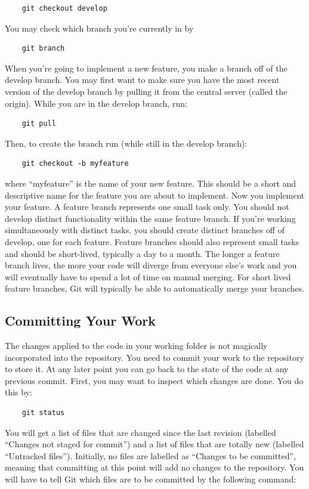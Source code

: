 \documentclass[10pt,a4paper]{article}
\begin{document}
\begin{verbatim}
	git checkout develop
\end{verbatim}
You may check which branch you're currently in by 

\begin{verbatim}
	git branch
\end{verbatim}

When you're going to implement a new feature, you make a branch off of the develop branch. You may first want to make sure you have the most recent version of the develop branch by pulling it from the central server (called the origin). While you are in the develop branch, run:

\begin{verbatim}
	git pull
\end{verbatim}
Then, to create the branch run (while still in the develop branch):

\begin{verbatim}
	git checkout -b myfeature
\end{verbatim}
where ``myfeature'' is the name of your new feature. This should be a short and descriptive name for the feature you are about to implement. Now you implement your feature. A feature branch represents one small task only. You should not develop distinct functionality within the same feature branch. If you're working simultaneously with distinct tasks, you should create distinct branches off of develop, one for each feature. Feature branches should also represent small tasks and should be short-lived, typically a day to a month. The longer a feature branch lives, the more your code will diverge from everyone else's work and you will eventually have to spend a lot of time on manual merging. For short lived feature branches, Git will typically be able to automatically merge your branches.

\subsection{Committing Your Work}
The changes applied to the code in your working folder is not magically incorporated into the repository. You need to commit your work to the repository to store it. At any later point you can go back to the state of the code at any previous commit. First, you may want to inspect which changes are done. You do this by:

\begin{verbatim}
	git status
\end{verbatim}
You will get a list of files that are changed since the last revision (labelled ``Changes not staged for commit'') and a list of files that are totally new (labelled ``Untracked files''). Initially, no files are labelled as ``Changes to be committed'', meaning that committing at this point will add no changes to the repository. You will have to tell Git which files are to be committed by the following command:
\end{document}
